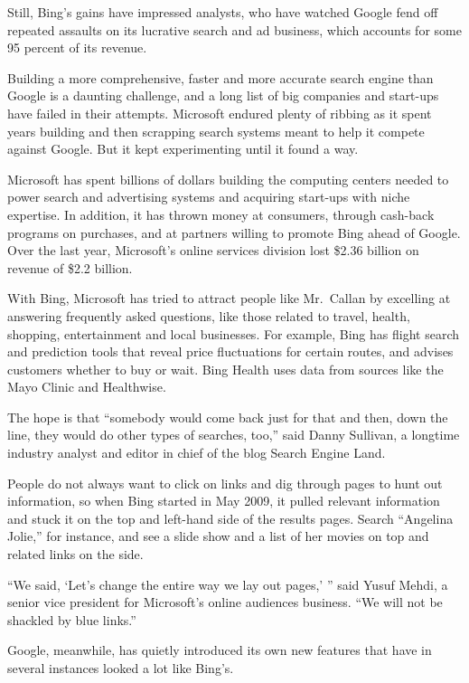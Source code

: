 ﻿\documentclass[12pt]{article}
\begin{document}
Still, Bing's gains have impressed analysts, who have watched Google fend off repeated assaults on
its lucrative search and ad business, which accounts for some 95 percent of its revenue.

Building a more comprehensive, faster and more accurate search engine than Google is a daunting
challenge, and a long list of big companies and start-ups have failed in their attempts. Microsoft
endured plenty of ribbing as it spent years building and then scrapping search systems meant to help
it compete against Google. But it kept experimenting until it found a way.

Microsoft has spent billions of dollars building the computing centers needed to power search and
advertising systems and acquiring start-ups with niche expertise. In addition, it has thrown money
at consumers, through cash-back programs on purchases, and at partners willing to promote Bing ahead
of Google. Over the last year, Microsoft's online services division lost \$2.36 billion on revenue
of \$2.2 billion.

With Bing, Microsoft has tried to attract people like Mr.~Callan by excelling at answering
frequently asked questions, like those related to travel, health, shopping, entertainment and local
businesses. For example, Bing has flight search and prediction tools that reveal price fluctuations
for certain routes, and advises customers whether to buy or wait. Bing Health uses data from sources
like the Mayo Clinic and Healthwise.

The hope is that ``somebody would come back just for that and then, down the line, they would do
other types of searches, too,'' said Danny Sullivan, a longtime industry analyst and editor in chief
of the blog Search Engine Land.

People do not always want to click on links and dig through pages to hunt out information, so when
Bing started in May 2009, it pulled relevant information and stuck it on the top and left-hand side
of the results pages. Search ``Angelina Jolie,'' for instance, and see a slide show and a list of
her movies on top and related links on the side.

``We said, `Let's change the entire way we lay out pages,' '' said Yusuf Mehdi, a senior vice
president for Microsoft's online audiences business. ``We will not be shackled by blue links.''

Google, meanwhile, has quietly introduced its own new features that have in several instances looked
a lot like Bing's.
\end{document}
